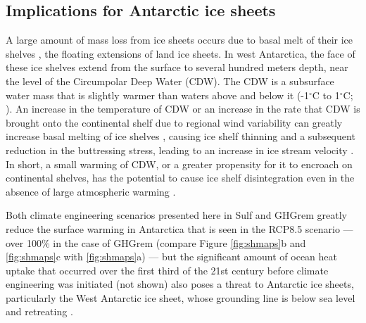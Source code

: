 \documentclass[draft,grl]{AGUTeX}  %
\begin{document}
\begin{article}
\section{Implications for Antarctic ice sheets}
A large amount of mass loss from ice sheets occurs due to basal melt of their ice shelves \citep{joughin11}, the floating extensions of land ice sheets. In west Antarctica, the face of these ice shelves extend from the surface to several hundred meters depth, near the level of the Circumpolar Deep Water (CDW). The CDW is a subsurface water mass that is slightly warmer than waters above and below it (-1$^\circ$C to 1$^\circ$C; \cite{yin11}). An increase in the temperature of CDW or an increase in the rate that CDW is brought onto the continental shelf due to regional wind variability can greatly increase basal melting of ice shelves \citep{thoma08,joughin11}, causing ice shelf thinning and a subsequent reduction in the buttressing stress, leading to an increase in ice stream velocity \citep{oppenheimer98}. In short, a small warming of CDW, or a greater propensity for it to encroach on continental shelves, has the potential to cause ice shelf disintegration even in the absence of large atmospheric warming \citep{oppenheimer98}. %

Both climate engineering scenarios presented here in Sulf and GHGrem greatly reduce the surface warming in Antarctica that is seen in the RCP8.5 scenario --- over 100\% in the case of GHGrem (compare Figure \ref{fig:shmaps}b and \ref{fig:shmaps}c with \ref{fig:shmaps}a) --- but the significant amount of ocean heat uptake that occurred over the first third of the 21st century before climate engineering was initiated (not shown) also poses a threat to Antarctic ice sheets, particularly the West Antarctic ice sheet, whose grounding line is below sea level \citep{joughin11} and retreating \citep{rignot14}. %


\end{article}
\end{document}
